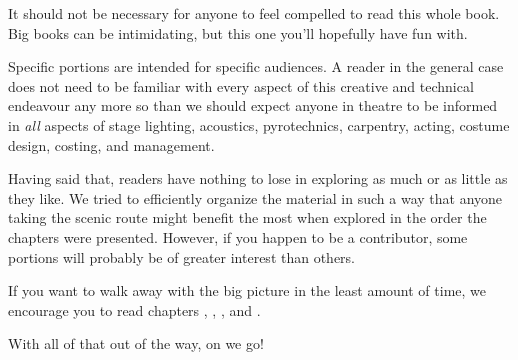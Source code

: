 

It should not be necessary for anyone to feel compelled to read this whole book. Big books can be intimidating, but this one you'll hopefully have fun with. 

Specific portions are intended for specific audiences. A reader in the general case does not need to be familiar with every aspect of this creative and technical endeavour any more so than we should expect anyone in theatre to be informed in {\it all} aspects of stage lighting, acoustics, pyrotechnics, carpentry, acting, costume design, costing, and management.

Having said that, readers have nothing to lose in exploring as much or as little as they like. We tried to efficiently organize the material in such a way that anyone taking the scenic route might benefit the most when explored in the order the chapters were presented. However, if you happen to be a contributor, some portions will probably be of greater interest than others.

If you want to walk away with the big picture in the least amount of time, we encourage you to read chapters \in[Leitmotifs], , , and \in[Timeline].

With all of that out of the way, on we go!

\StopChapter

